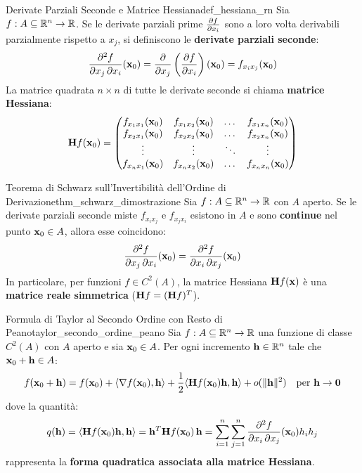 \begin{definizione}{Derivate Parziali Seconde e Matrice Hessiana}{def_hessiana_rn}
Sia $f: A \subseteq \mathbb{R}^n \to \mathbb{R}$. Se le derivate parziali prime $\frac{\partial f}{\partial x_i}$ sono a loro volta derivabili parzialmente rispetto a $x_j$, si definiscono le \textbf{derivate parziali seconde}:
\[
\frac{\partial^2 f}{\partial x_j \, \partial x_i}(\mathbf{x}_0) = \frac{\partial }{\partial x_j} \left( \frac{\partial f}{\partial x_i} \right)(\mathbf{x}_0) = f_{x_i x_j}(\mathbf{x}_0)
\]
La matrice quadrata $n \times n$ di tutte le derivate seconde si chiama \textbf{matrice Hessiana}:
\[
\mathbf{H} f(\mathbf{x}_0) = \begin{pmatrix}
f_{x_1 x_1}(\mathbf{x}_0) & f_{x_1 x_2}(\mathbf{x}_0) & \dots & f_{x_1 x_n}(\mathbf{x}_0) \\
f_{x_2 x_1}(\mathbf{x}_0) & f_{x_2 x_2}(\mathbf{x}_0) & \dots & f_{x_2 x_n}(\mathbf{x}_0) \\
\vdots & \vdots & \ddots & \vdots \\
f_{x_n x_1}(\mathbf{x}_0) & f_{x_n x_2}(\mathbf{x}_0) & \dots & f_{x_n x_n}(\mathbf{x}_0)
\end{pmatrix}
\]
\end{definizione}

\begin{teorema}{Teorema di Schwarz sull'Invertibilità dell'Ordine di Derivazione}{thm_schwarz_dimostrazione}
Sia $f: A \subseteq \mathbb{R}^n \to \mathbb{R}$ con $A$ aperto. Se le derivate parziali seconde miste $f_{x_i x_j}$ e $f_{x_j x_i}$ esistono in $A$ e sono \textbf{continue} nel punto $\mathbf{x}_0 \in A$, allora esse coincidono:
\[
\frac{\partial^2 f}{\partial x_j \, \partial x_i}(\mathbf{x}_0) = \frac{\partial^2 f}{\partial x_i \, \partial x_j}(\mathbf{x}_0)
\]
In particolare, per funzioni $f \in C^2(A)$, la matrice Hessiana $\mathbf{H} f(\mathbf{x})$ è una \textbf{matrice reale simmetrica} ($\mathbf{H} f = (\mathbf{H} f)^T$).
\end{teorema}

\begin{teorema}{Formula di Taylor al Secondo Ordine con Resto di Peano}{taylor_secondo_ordine_peano}
Sia $f: A \subseteq \mathbb{R}^n \to \mathbb{R}$ una funzione di classe $C^2(A)$ con $A$ aperto e sia $\mathbf{x}_0 \in A$. Per ogni incremento $\mathbf{h} \in \mathbb{R}^n$ tale che $\mathbf{x}_0 + \mathbf{h} \in A$:
\[
f(\mathbf{x}_0 + \mathbf{h}) = f(\mathbf{x}_0) + \langle\nabla f(\mathbf{x}_0), \mathbf{h}\rangle + \frac{1}{2} \langle\mathbf{H} f(\mathbf{x}_0) \mathbf{h}, \mathbf{h}\rangle + o(\lVert\mathbf{h}\rVert^2) \quad \text{per } \mathbf{h} \to \mathbf{0}
\]
dove la quantità:
\[
q(\mathbf{h}) = \langle\mathbf{H} f(\mathbf{x}_0) \mathbf{h}, \mathbf{h}\rangle = \mathbf{h}^T \mathbf{H} f(\mathbf{x}_0) \, \mathbf{h} = \sum_{i=1}^n \sum_{j=1}^n \frac{\partial^2 f}{\partial x_i \, \partial x_j}(\mathbf{x}_0) h_i h_j
\]
rappresenta la \textbf{forma quadratica associata alla matrice Hessiana}.
\end{teorema}
